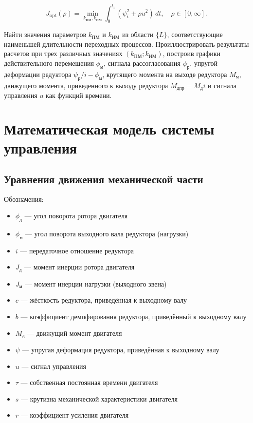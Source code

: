 \documentclass[14pt]{extreport}
\begin{document}
{\[
J_{\text{opt}}(\rho) = \min_{k_{\text{ПМ}}, k_{\text{ИМ}}} \int_{0}^{t_i} (\psi_i^2 + \rho u^2) \, dt, \quad \rho \in [0, \infty].
\]

Найти значения параметров $k_{\text{ПМ}}$ и $k_{\text{ИМ}}$ из области $\{L\}$, соответствующие наименьшей длительности переходных процессов. Проиллюстрировать результаты расчетов при трех различных значениях $(k_{\text{ПМ}}; k_{\text{ИМ}})$, построив графики действительного перемещения $\phi_{\text{м}}$, сигнала рассогласования $\psi_{\text{р}}$, упругой деформации редуктора $\psi_{\text{р}}/i - \phi_{\text{м}}$, крутящего момента на выходе редуктора $M_{\text{м}}$, движущего момента, приведенного к выходу редуктора $M_{\text{дпр}} = M_{\text{д}} i$ и сигнала управления $u$ как функций времени.


        \newpage
        \section{Математическая модель системы управления}
        

        \subsection{Уравнения движения механической части}
        Обозначения:
        \begin{itemize}
            \item $\phi_{\text{д}}$  --- угол поворота ротора двигателя
\item $\phi_{\text{м}}$  --- угол поворота выходного вала редуктора (нагрузки)
\item $i$  --- передаточное отношение редуктора
\item $J_{\text{д}}$  --- момент инерции ротора двигателя
\item $J_{\text{м}}$  --- момент инерции нагрузки (выходного звена)
\item $c$  --- жёсткость редуктора, приведённая к выходному валу
\item $b$  --- коэффициент демпфирования редуктора, приведённый к выходному валу
\item $M_{\text{д}}$  --- движущий момент двигателя
\item $\psi$  --- упругая деформация редуктора, приведённая к выходному валу
\item $u$  --- сигнал управления 
\item $\tau$  --- собственная постоянная времени двигателя 
\item $s$  --- крутизна механической характеристики двигателя
\item $r$  --- коэффициент усиления двигателя
        \end{itemize}

}
\end{document}
